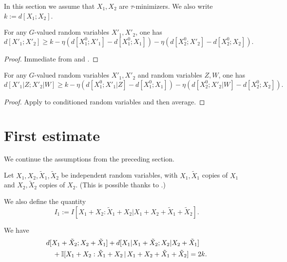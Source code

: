 In this section we assume that $X_1,X_2$ are $\tau$-minimizers. We also write $k := d[X_1;X_2]$.

\begin{lemma}\label{distance-lower}
  \leanok
  For any $G$-valued random variables $X'_1,X'_2$, one has
$$ d[X'_1;X'_2] \geq k - \eta (d[X^0_1;X'_1] - d[X^0_1;X_1] ) - \eta (d[X^0_2;X'_2] - d[X^0_2;X_2] ).$$
\end{lemma}

\begin{proof}
  \leanok
  Immediate from  and .
\end{proof}

\begin{lemma}\label{cond-distance-lower}
  \leanok
  For any $G$-valued random variables $X'_1,X'_2$ and random variables $Z,W$, one has
$$ d[X'_1|Z;X'_2|W] \geq k - \eta (d[X^0_1;X'_1|Z] - d[X^0_1;X_1] ) - \eta (d[X^0_2;X'_2|W] - d[X^0_2;X_2] ).$$
\end{lemma}

\begin{proof}\leanok  Apply  to conditioned random variables and then average.
\end{proof}

\section{First estimate}

We continue the assumptions from the preceding section.

Let $X_1, X_2, \tilde X_1, \tilde X_2$ be independent random variables, with $X_1,\tilde X_1$ copies of $X_1$ and $X_2,\tilde X_2$ copies of $X_2$.  (This is possible thanks to .)

We also define the quantity
$$ I_1 :=  I [X_1+X_2 : \tilde X_1 + X_2 | X_1+X_2+\tilde X_1+\tilde X_2].$$

\begin{lemma}\label{first-fibre}
  \leanok
  We have
  \begin{align*}
    &   d[X_1+\tilde X_2;X_2+\tilde X_1] + d[X_1|X_1+\tilde X_2; X_2|X_2+\tilde X_1] \\
    &\quad + \mathbb{I}[X_1+ X_2 : \tilde X_1 + X_2 \,|\, X_1 + X_2 + \tilde X_1 + \tilde X_2] = 2k.
  \end{align*}
\end{lemma}

